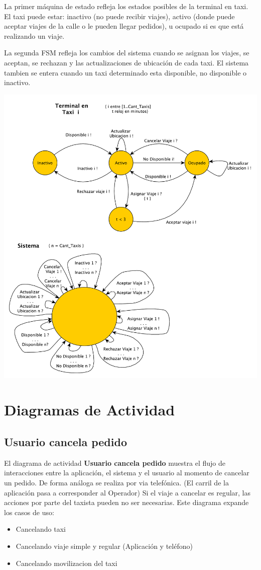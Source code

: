 \documentclass[a4paper]{article}
\begin{document}
La primer m\'aquina de estado refleja los estados posibles de la terminal en taxi. El taxi
puede estar: inactivo (no puede recibir viajes), activo (donde puede aceptar viajes de la calle o le pueden llegar pedidos), 
u ocupado si es que est\'a realizando un viaje.

La segunda FSM refleja los cambios del sistema cuando se asignan los viajes, se aceptan, se rechazan y las actualizaciones de ubicaci\'on de cada
taxi. El sistema tambien se entera cuando un taxi determinado esta disponible, no disponible o inactivo.

\begin{center}
\includegraphics[scale=0.7]{diag_FSM.pdf}
\end{center}

\clearpage
\section{Diagramas de Actividad}
\subsection{Usuario cancela pedido}
El diagrama de actividad \textbf{Usuario cancela pedido} muestra el flujo de interacciones entre la aplicaci\'on, el sistema y el usuario 
al momento de cancelar un pedido. De forma an\'aloga se realiza por via telef\'onica. (El carril de la aplicaci\'on pasa a corresponder al Operador)
Si el viaje a cancelar es regular, las acciones por parte del taxista pueden no ser necesarias.
Este diagrama expande los casos de uso:
\begin{itemize}
\item Cancelando taxi
\item Cancelando viaje simple y regular (Aplicaci\'on y tel\'efono)
\item Cancelando movilizacion del taxi
\end{itemize}
\end{document}
